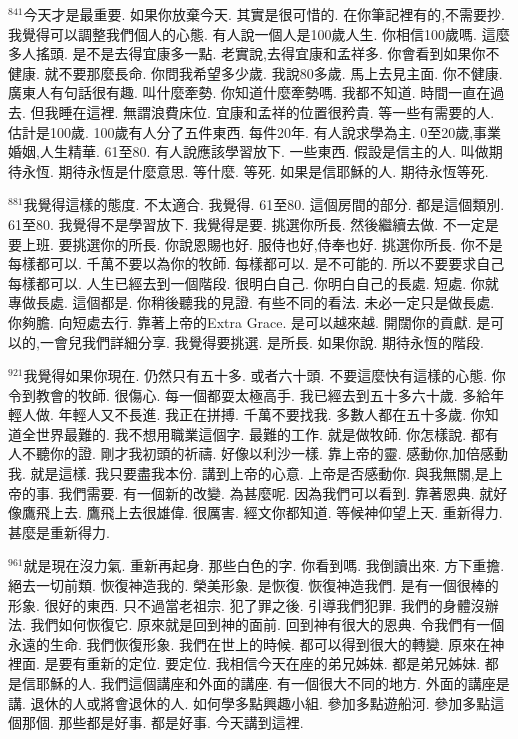 \documentclass{book}
\begin{document}
$^{841}$今天才是最重要.
如果你放棄今天.
其實是很可惜的.
在你筆記裡有的,不需要抄.
我覺得可以調整我們個人的心態.
有人說一個人是100歲人生.
你相信100歲嗎.
這麼多人搖頭.
是不是去得宜康多一點.
老實說,去得宜康和孟祥多.
你會看到如果你不健康.
就不要那麼長命.
你問我希望多少歲.
我說80多歲.
馬上去見主面.
你不健康.
廣東人有句話很有趣.
叫什麼牽勢.
你知道什麼牽勢嗎.
我都不知道.
時間一直在過去.
但我睡在這裡.
無謂浪費床位.
宜康和孟祥的位置很矜貴.
等一些有需要的人.
估計是100歲.
100歲有人分了五件東西.
每件20年.
有人說求學為主.
0至20歲,事業婚姻,人生精華.
61至80.
有人說應該學習放下.
一些東西.
假設是信主的人.
叫做期待永恆.
期待永恆是什麼意思.
等什麼.
等死.
如果是信耶穌的人.
期待永恆等死.

$^{881}$我覺得這樣的態度.
不太適合.
我覺得.
61至80.
這個房間的部分.
都是這個類別.
61至80.
我覺得不是學習放下.
我覺得是要.
挑選你所長.
然後繼續去做.
不一定是要上班.
要挑選你的所長.
你說恩賜也好.
服侍也好,侍奉也好.
挑選你所長.
你不是每樣都可以.
千萬不要以為你的牧師.
每樣都可以.
是不可能的.
所以不要要求自己每樣都可以.
人生已經去到一個階段.
很明白自己.
你明白自己的長處.
短處.
你就專做長處.
這個都是.
你稍後聽我的見證.
有些不同的看法.
未必一定只是做長處.
你夠膽.
向短處去行.
靠著上帝的Extra Grace.
是可以越來越.
開闊你的貢獻.
是可以的,一會兒我們詳細分享.
我覺得要挑選.
是所長.
如果你說.
期待永恆的階段.

$^{921}$我覺得如果你現在.
仍然只有五十多.
或者六十頭.
不要這麼快有這樣的心態.
你令到教會的牧師.
很傷心.
每一個都耍太極高手.
我已經去到五十多六十歲.
多給年輕人做.
年輕人又不長進.
我正在拼搏.
千萬不要找我.
多數人都在五十多歲.
你知道全世界最難的.
我不想用職業這個字.
最難的工作.
就是做牧師.
你怎樣說.
都有人不聽你的證.
剛才我初頭的祈禱.
好像以利沙一樣.
靠上帝的靈.
感動你,加倍感動我.
就是這樣.
我只要盡我本份.
講到上帝的心意.
上帝是否感動你.
與我無關,是上帝的事.
我們需要.
有一個新的改變.
為甚麼呢.
因為我們可以看到.
靠著恩典.
就好像鷹飛上去.
鷹飛上去很雄偉.
很厲害.
經文你都知道.
等候神仰望上天.
重新得力.
甚麼是重新得力.

$^{961}$就是現在沒力氣.
重新再起身.
那些白色的字.
你看到嗎.
我倒讀出來.
方下重擔.
絕去一切前類.
恢復神造我的.
榮美形象.
是恢復.
恢復神造我們.
是有一個很棒的形象.
很好的東西.
只不過當老祖宗.
犯了罪之後.
引導我們犯罪.
我們的身體沒辦法.
我們如何恢復它.
原來就是回到神的面前.
回到神有很大的恩典.
令我們有一個永遠的生命.
我們恢復形象.
我們在世上的時候.
都可以得到很大的轉變.
原來在神裡面.
是要有重新的定位.
要定位.
我相信今天在座的弟兄姊妹.
都是弟兄姊妹.
都是信耶穌的人.
我們這個講座和外面的講座.
有一個很大不同的地方.
外面的講座是講.
退休的人或將會退休的人.
如何學多點興趣小組.
參加多點遊船河.
參加多點這個那個.
那些都是好事.
都是好事.
今天講到這裡.
\end{document}
